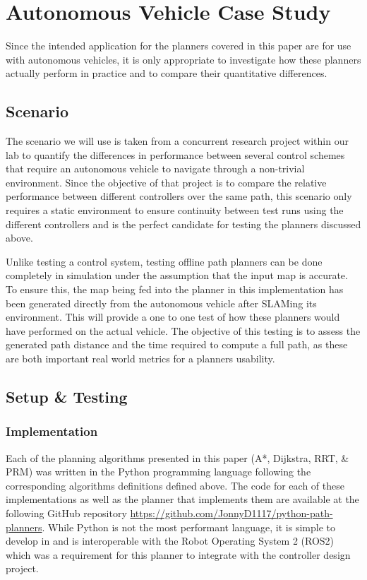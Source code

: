 \section{Autonomous Vehicle Case Study}

Since the intended application for the planners covered in this paper are for use with autonomous vehicles, it is only appropriate to investigate how these planners actually perform in practice and to compare their quantitative differences.

\subsection{Scenario}
The scenario we will use is taken from a concurrent research project within our lab to quantify the differences in performance between several control schemes that require an autonomous vehicle to navigate through a non-trivial environment. Since the objective of that project is to compare the relative performance between different controllers over the same path, this scenario only requires a static environment to ensure continuity between test runs using the different controllers and is the perfect candidate for testing the planners discussed above.

Unlike testing a control system, testing offline path planners can be done completely in simulation under the assumption that the input map is accurate. To ensure this, the map being fed into the planner in this implementation has been generated directly from the autonomous vehicle after SLAMing its environment. This will provide a one to one test of how these planners would have performed on the actual vehicle. The objective of this testing is to assess the  generated path distance and the time required to compute a full path, as these are both important real world metrics for a planners usability.

\subsection{Setup \& Testing}


\newline

\subsubsection{Implementation}
\newline

Each of the planning algorithms presented in this paper (A*, Dijkstra, RRT, \& PRM) was written in the Python programming language following the corresponding algorithms definitions defined above. The code for each of these implementations as well as the planner that implements them are available at the following GitHub repository \url{https://github.com/JonnyD1117/python-path-planners}. While Python is not the most performant language, it is simple to develop in and is interoperable with the Robot Operating System 2 (ROS2) which was a requirement for this planner to integrate with the controller design project.


